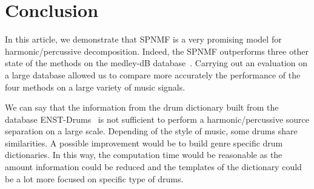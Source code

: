 \section{Conclusion}
\label{sec:conc}

In this article, we demonstrate that SPNMF is a very promising model for harmonic/percussive decomposition. Indeed, the SPNMF outperforms three other state of the methods on the medley-dB database~\cite{bittner2014medleydb}. Carrying out an evaluation on a large database allowed us to compare more accurately the performance of the four methods on a large variety of music signals. 


We can say that the information from the drum dictionary built from the database ENST-Drums~\cite{gillet2006enst} is not sufficient to perform a harmonic/percussive source separation on a large scale. Depending of the style of music, some drums share similarities. A possible improvement would be to build genre specific drum dictionaries. In this way, the computation time would be reasonable as the amount information could be reduced and the templates of the dictionary could be a lot more focused on specific type of drums. 


